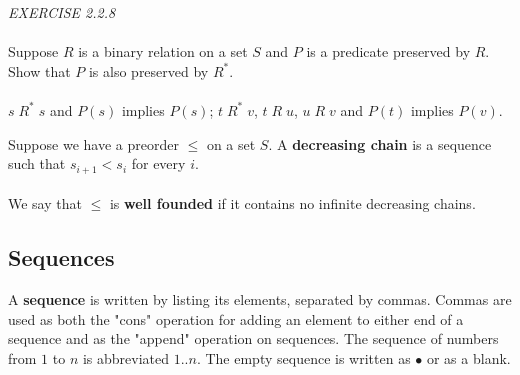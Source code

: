 \documentclass{article}
\begin{document}
\begin{siderules}\color{blue}\textit{EXERCISE 2.2.8}\color{black}\\\\
\color{blue} Suppose \(R\) is a binary relation on a set \(S\) and \(P\) is a predicate preserved by \(R\). Show that \(P\) is also preserved by \(R^{*}\).\\\\\color{black}
\(s\;R^{*}\; s\) and \(P(s)\) implies \(P(s)\); \(t\;R^{*}\; v\), \(t\;R\; u\), \(u\;R\; v\) and \(P(t)\) implies \(P(v)\).
\end{siderules}
Suppose we have a preorder \(\le\) on a set \(S\). A \textbf{decreasing chain} is a sequence such that \(s_{i+1}<s_{i}\) for every \(i\).\\\\
We say that \(\le\) is \textbf{well founded} if it contains no infinite decreasing chains.
\subsection{Sequences}
A \textbf{sequence} is written by listing its elements, separated by commas. Commas are used as both the "cons" operation for adding an element to either end of a sequence and as the "append" operation on sequences.
The sequence of numbers from \(1\) to \(n\) is abbreviated \(1..n\). The empty sequence is written as \(\bullet\) or as a blank.
\end{document}
